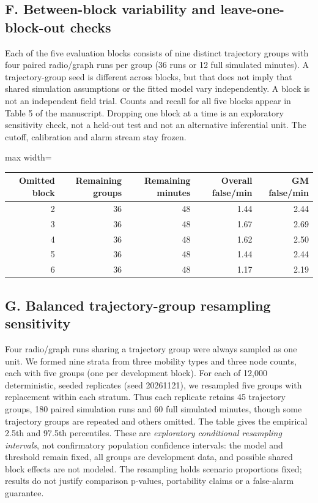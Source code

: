 \documentclass[10pt,a4paper]{article}
\begin{document}
\newpage
\subsection*{F. Between-block variability and leave-one-block-out checks}
\noindent Each of the five evaluation blocks consists of nine distinct trajectory groups with four paired radio/graph runs per group (36 runs or 12 full simulated minutes). A trajectory-group seed is different across blocks, but that does not imply that shared simulation assumptions or the fitted model vary independently. A block is not an independent field trial. Counts and recall for all five blocks appear in Table 5 of the manuscript. Dropping one block at a time is an exploratory sensitivity check, not a held-out test and not an alternative inferential unit. The cutoff, calibration and alarm stream stay frozen.

\begin{center}
\small
\setlength{\tabcolsep}{5pt}
\begin{adjustbox}{max width=\linewidth}\begin{tabular}{rrrrr}
\toprule
Omitted block & Remaining groups & Remaining minutes & Overall false/min & GM false/min \\
\midrule
2 & 36 & 48 & 1.44 & 2.44 \\
3 & 36 & 48 & 1.67 & 2.69 \\
4 & 36 & 48 & 1.62 & 2.50 \\
5 & 36 & 48 & 1.44 & 2.44 \\
6 & 36 & 48 & 1.17 & 2.19 \\
\bottomrule
\end{tabular}\end{adjustbox}
\end{center}

\subsection*{G. Balanced trajectory-group resampling sensitivity}
\noindent Four radio/graph runs sharing a trajectory group were always sampled as one unit. We formed nine strata from three mobility types and three node counts, each with five groups (one per development block). For each of 12,000 deterministic, seeded replicates (seed 20261121), we resampled five groups with replacement within each stratum. Thus each replicate retains 45 trajectory groups, 180 paired simulation runs and 60 full simulated minutes, though some trajectory groups are repeated and others omitted. The table gives the empirical 2.5th and 97.5th percentiles. These are \emph{exploratory conditional resampling intervals}, not confirmatory population confidence intervals: the model and threshold remain fixed, all groups are development data, and possible shared block effects are not modeled. The resampling holds scenario proportions fixed; results do not justify comparison p-values, portability claims or a false-alarm guarantee.
\end{document}

